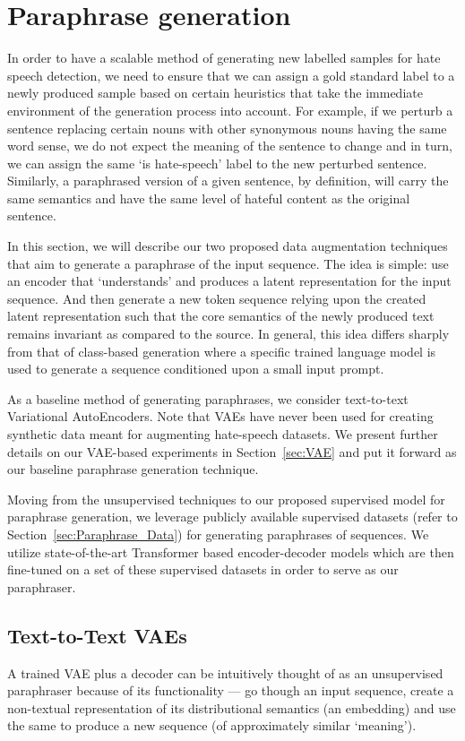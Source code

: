 \documentclass[11pt,a4paper]{article}
\begin{document}
\section{Paraphrase generation}
In order to have a scalable method of generating new labelled samples for hate speech detection, we need to ensure that we can assign a gold standard label to a newly produced sample based on certain heuristics that take the immediate environment of the generation process into account. For example, if we perturb a sentence replacing certain nouns with other synonymous nouns having the same word sense, we do not expect the meaning of the sentence to change and in turn, we can assign the same `is hate-speech' label to the new perturbed sentence. Similarly, a paraphrased version of a given sentence, by definition, will carry the same semantics and have the same level of hateful content as the original sentence.

In this section, we will describe our two proposed data augmentation techniques that aim to generate a paraphrase of the input sequence. The idea is simple: use an encoder that `understands' and produces a latent representation for the input sequence. And then generate a new token sequence relying upon the created latent representation such that the core semantics of the newly produced text remains invariant as compared to the source. In general, this idea differs sharply from that of class-based generation where a specific trained language model is used to generate a sequence conditioned upon a small input prompt.

As a baseline method of generating paraphrases, we consider text-to-text Variational AutoEncoders. Note that VAEs have never been used for creating synthetic data meant for augmenting hate-speech datasets. We present further details on our VAE-based experiments in Section~\ref{sec:VAE} and put it forward as our baseline paraphrase generation technique.

Moving from the unsupervised techniques to our proposed supervised model for paraphrase generation, we leverage publicly available supervised datasets (refer to Section~\ref{sec:Paraphrase_Data}) for generating paraphrases of sequences. We utilize state-of-the-art Transformer based encoder-decoder models which are then fine-tuned on a set of these supervised datasets in order to serve as our paraphraser.

\label{sec:VAE}
\subsection{Text-to-Text VAEs}
A trained VAE plus a decoder can be intuitively thought of as an unsupervised paraphraser because of its functionality — go though an input sequence, create a non-textual representation of its distributional semantics (an embedding) and use the same to produce a new sequence (of approximately similar `meaning'). 
\end{document}
